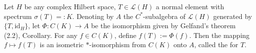 Let $H$ be any complex Hilbert space, $T \in \mathcal{L}(H)$ a normal element with spectrum $\sigma(T) =: K$. Denoting by $A$ the $C^*$-subalgebra of $\mathcal{L}(H)$ generated by $\{T, \mathrm{id}_H\}$, let $\Phi : C(K) \to A$ be the isomorphism given by Gelfand's theorem (2.2), Corollary. For any $f \in C(K)$, define $f(T) := \Phi(f)$. Then the mapping $f \mapsto f(T)$ is an isometric $*$-isomorphism from $C(K)$ onto $A$, called the  for $T$.

